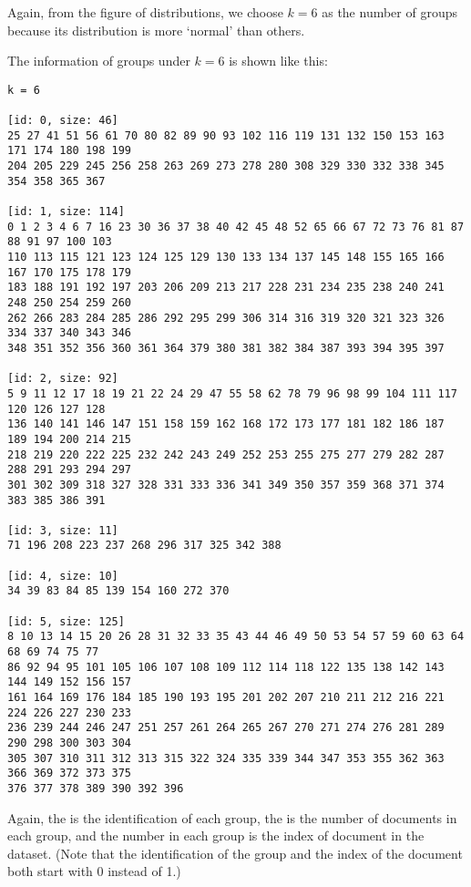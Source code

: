 \documentclass[a4paper, 12pt]{article}
\begin{document}
Again, from the figure of distributions, we choose $k=6$ as the number of groups because its distribution is more `normal' than others.

The information of groups under $k=6$ is shown like this:

\begin{lstlisting}[style=plainText,caption={Results of spectral clustering when $k=6$}]
k = 6

[id: 0, size: 46]
25 27 41 51 56 61 70 80 82 89 90 93 102 116 119 131 132 150 153 163 171 174 180 198 199
204 205 229 245 256 258 263 269 273 278 280 308 329 330 332 338 345 354 358 365 367

[id: 1, size: 114]
0 1 2 3 4 6 7 16 23 30 36 37 38 40 42 45 48 52 65 66 67 72 73 76 81 87 88 91 97 100 103
110 113 115 121 123 124 125 129 130 133 134 137 145 148 155 165 166 167 170 175 178 179
183 188 191 192 197 203 206 209 213 217 228 231 234 235 238 240 241 248 250 254 259 260
262 266 283 284 285 286 292 295 299 306 314 316 319 320 321 323 326 334 337 340 343 346
348 351 352 356 360 361 364 379 380 381 382 384 387 393 394 395 397

[id: 2, size: 92]
5 9 11 12 17 18 19 21 22 24 29 47 55 58 62 78 79 96 98 99 104 111 117 120 126 127 128
136 140 141 146 147 151 158 159 162 168 172 173 177 181 182 186 187 189 194 200 214 215
218 219 220 222 225 232 242 243 249 252 253 255 275 277 279 282 287 288 291 293 294 297
301 302 309 318 327 328 331 333 336 341 349 350 357 359 368 371 374 383 385 386 391

[id: 3, size: 11]
71 196 208 223 237 268 296 317 325 342 388

[id: 4, size: 10]
34 39 83 84 85 139 154 160 272 370

[id: 5, size: 125]
8 10 13 14 15 20 26 28 31 32 33 35 43 44 46 49 50 53 54 57 59 60 63 64 68 69 74 75 77
86 92 94 95 101 105 106 107 108 109 112 114 118 122 135 138 142 143 144 149 152 156 157
161 164 169 176 184 185 190 193 195 201 202 207 210 211 212 216 221 224 226 227 230 233
236 239 244 246 247 251 257 261 264 265 267 270 271 274 276 281 289 290 298 300 303 304
305 307 310 311 312 313 315 322 324 335 339 344 347 353 355 362 363 366 369 372 373 375
376 377 378 389 390 392 396
\end{lstlisting}

Again, the  is the identification of each group, the  is the number of documents in each group, and the number in each group is the index of document in the dataset. (Note that the identification of the group and the index of the document both start with 0 instead of 1.)
\end{document}
